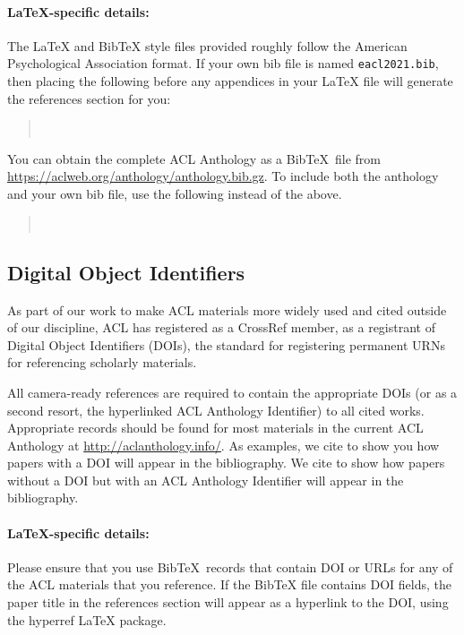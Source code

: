 \documentclass[11pt,a4paper]{article}
\begin{document}
\paragraph{\LaTeX-specific details:}
The \LaTeX{} and Bib\TeX{} style files provided roughly follow the American Psychological Association format.
If your own bib file is named \texttt{\small eacl2021.bib}, then placing the following before any appendices in your \LaTeX{}  file will generate the references section for you:
\begin{quote}\small
\verb||\\
\verb||
\end{quote}

You can obtain the complete ACL Anthology as a Bib\TeX\ file from \url{https://aclweb.org/anthology/anthology.bib.gz}.
To include both the anthology and your own bib file, use the following instead of the above.
\begin{quote}\small
\verb||\\
\verb||
\end{quote}


\subsection{Digital Object Identifiers}
As part of our work to make ACL materials more widely used and cited outside of our discipline, ACL has registered as a CrossRef member, as a registrant of Digital Object Identifiers (DOIs), the standard for registering permanent URNs for referencing scholarly materials.

All camera-ready references are required to contain the appropriate DOIs (or as a second resort, the hyperlinked ACL Anthology Identifier) to all cited works.
Appropriate records should be found for most materials in the current ACL Anthology at \url{http://aclanthology.info/}.
As examples, we cite \citep{goodman-etal-2016-noise} to show you how papers with a DOI will appear in the bibliography.
We cite \citep{harper-2014-learning} to show how papers without a DOI but with an ACL Anthology Identifier will appear in the bibliography.

\paragraph{\LaTeX-specific details:}
Please ensure that you use Bib\TeX\ records that contain DOI or URLs for any of the ACL materials that you reference.
If the Bib\TeX{} file contains DOI fields, the paper title in the references section will appear as a hyperlink to the DOI, using the hyperref \LaTeX{} package.
\end{document}
